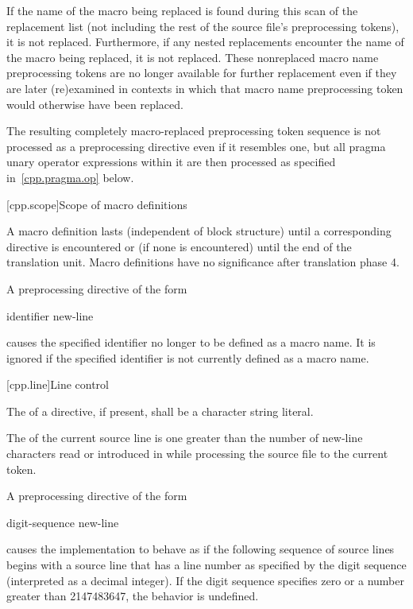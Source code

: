 \pnum
If the name of the macro being replaced is found during this scan of
the replacement list
(not including the rest of the source file's preprocessing tokens),
it is not replaced.
Furthermore,
if any nested replacements encounter the name of the macro being replaced,
it is not replaced.
These nonreplaced macro name preprocessing tokens are no longer available
for further replacement even if they are later (re)examined in contexts
in which that macro name preprocessing token would otherwise have been
replaced.

\pnum
The resulting completely macro-replaced preprocessing token sequence
is not processed as a preprocessing directive even if it resembles one,
but all pragma unary operator expressions within it are then processed as
specified in~\ref{cpp.pragma.op} below.

[cpp.scope]{Scope of macro definitions}%
%

\pnum
A macro definition lasts
(independent of block structure)
until a corresponding
directive is encountered or
(if none is encountered)
until the end of the translation unit.
Macro definitions have no significance after translation phase 4.

\pnum
A preprocessing directive of the form
\begin{ncsimplebnf}
 identifier new-line
%
\end{ncsimplebnf}
causes the specified identifier no longer to be defined as a macro name.
It is ignored if the specified identifier is not currently defined as
a macro name.


[cpp.line]{Line control}%
%

\pnum
The  of a
directive, if present,
shall be a character string literal.

\pnum
The
of the current source line is one greater than
the number of new-line characters read or introduced
in 
while processing the source file to the current token.

\pnum
A preprocessing directive of the form
\begin{ncsimplebnf}
 digit-sequence new-line
\end{ncsimplebnf}
causes the implementation to behave as if
the following sequence of source lines begins with a
source line that has a line number as specified
by the digit sequence (interpreted as a decimal integer).
If the digit sequence specifies zero
or a number greater than 2147483647,
the behavior is undefined.

